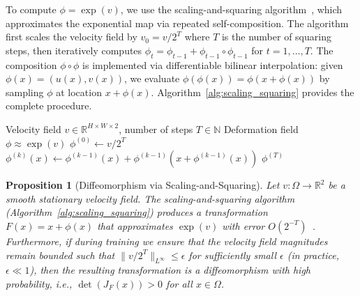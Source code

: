 \documentclass[final,3p,times,review,sort&compress]{elsarticle}
\newtheorem{proposition}{Proposition}
\begin{document}
To compute $\phi = \exp(v)$, we use the scaling-and-squaring algorithm~\cite{arsigny2006logdiff}, which approximates the exponential map via repeated self-composition. The algorithm first scales the velocity field by $v_0 = v / 2^T$ where $T$ is the number of squaring steps, then iteratively computes $\phi_t = \phi_{t-1} + \phi_{t-1} \circ \phi_{t-1}$ for $t = 1, \ldots, T$. The composition $\phi \circ \phi$ is implemented via differentiable bilinear interpolation: given $\phi(x) = (u(x), v(x))$, we evaluate $\phi(\phi(x)) = \phi(x + \phi(x))$ by sampling $\phi$ at location $x + \phi(x)$. Algorithm~\ref{alg:scaling_squaring} provides the complete procedure.

\begin{algorithm}[t]
\caption{Scaling-and-Squaring for Diffeomorphic Integration}
\label{alg:scaling_squaring}
\begin{algorithmic}[1]
\REQUIRE Velocity field $v \in \mathbb{R}^{H \times W \times 2}$, number of steps $T \in \mathbb{N}$
\ENSURE Deformation field $\phi \approx \exp(v)$
\STATE $\phi^{(0)} \leftarrow v / 2^T$ \quad {}
    \STATE $\phi^{(k)}(x) \leftarrow \phi^{(k-1)}(x) + \phi^{(k-1)}(x + \phi^{(k-1)}(x))$ \quad {}
\ENDFOR
\RETURN $\phi^{(T)}$
\end{algorithmic}
\end{algorithm}

\begin{proposition}[Diffeomorphism via Scaling-and-Squaring]
\label{prop:diffeomorphism}
Let $v: \Omega \rightarrow \mathbb{R}^2$ be a smooth stationary velocity field. The scaling-and-squaring algorithm (Algorithm~\ref{alg:scaling_squaring}) produces a transformation $F(x) = x + \phi(x)$ that approximates $\exp(v)$ with error $O(2^{-T})$~\cite{arsigny2006logdiff}. Furthermore, if during training we ensure that the velocity field magnitudes remain bounded such that $\|v/2^T\|_{L^\infty} \leq \epsilon$ for sufficiently small $\epsilon$ (in practice, $\epsilon \ll 1$), then the resulting transformation is a diffeomorphism with high probability, i.e., $\det(J_F(x)) > 0$ for all $x \in \Omega$.
\end{proposition}
\end{document}
